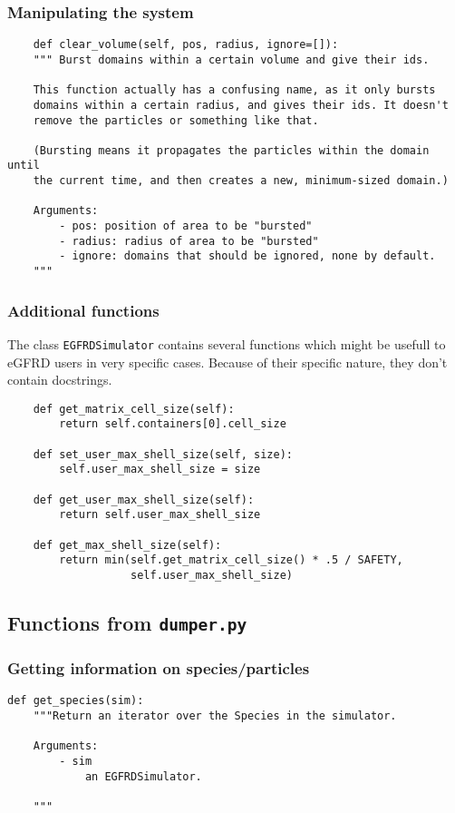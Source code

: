 \documentclass[a4paper,10pt]{article}
\begin{document}
\subsubsection{Manipulating the system}
\begin{verbatim}
    def clear_volume(self, pos, radius, ignore=[]):
    """ Burst domains within a certain volume and give their ids.

    This function actually has a confusing name, as it only bursts 
    domains within a certain radius, and gives their ids. It doesn't
    remove the particles or something like that.

    (Bursting means it propagates the particles within the domain until
    the current time, and then creates a new, minimum-sized domain.)

    Arguments:
        - pos: position of area to be "bursted"
        - radius: radius of area to be "bursted"
        - ignore: domains that should be ignored, none by default.
    """ 
\end{verbatim}


\subsubsection{Additional functions}
The class \texttt{EGFRDSimulator} contains several functions which might be usefull to eGFRD users in very specific cases. Because of their specific nature, they don't contain docstrings. 
\begin{verbatim}
    def get_matrix_cell_size(self):
        return self.containers[0].cell_size

    def set_user_max_shell_size(self, size):
        self.user_max_shell_size = size

    def get_user_max_shell_size(self):
        return self.user_max_shell_size

    def get_max_shell_size(self):
        return min(self.get_matrix_cell_size() * .5 / SAFETY,
                   self.user_max_shell_size)
\end{verbatim}

\subsection{Functions from \texttt{dumper.py}}

\subsubsection{Getting information on species/particles}
\begin{verbatim}
def get_species(sim):
    """Return an iterator over the Species in the simulator.

    Arguments:
        - sim
            an EGFRDSimulator.

    """
\end{verbatim}
\end{document}
